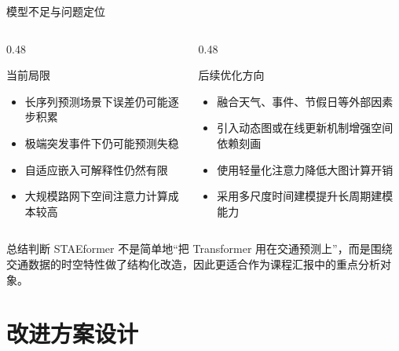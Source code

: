 \documentclass[10pt,aspectratio=169]{ctexbeamer}
\begin{document}
\begin{frame}{模型不足与问题定位}
  \begin{columns}[T]
    \begin{column}{0.48\textwidth}
      \begin{alertblock}{当前局限}
        \begin{itemize}
          \item 长序列预测场景下误差仍可能逐步积累
          \item 极端突发事件下仍可能预测失稳
          \item 自适应嵌入可解释性仍然有限
          \item 大规模路网下空间注意力计算成本较高
        \end{itemize}
      \end{alertblock}
    \end{column}
    \begin{column}{0.48\textwidth}
      \begin{exampleblock}{后续优化方向}
        \begin{itemize}
          \item 融合天气、事件、节假日等外部因素
          \item 引入动态图或在线更新机制增强空间依赖刻画
          \item 使用轻量化注意力降低大图计算开销
          \item 采用多尺度时间建模提升长周期建模能力
        \end{itemize}
      \end{exampleblock}
    \end{column}
  \end{columns}

  \vspace{0.25cm}
  \begin{block}{总结判断}
    STAEformer 不是简单地“把 Transformer 用在交通预测上”，而是围绕交通数据的时空特性做了结构化改造，因此更适合作为课程汇报中的重点分析对象。
  \end{block}
\end{frame}

\section{改进方案设计}
\end{document}
